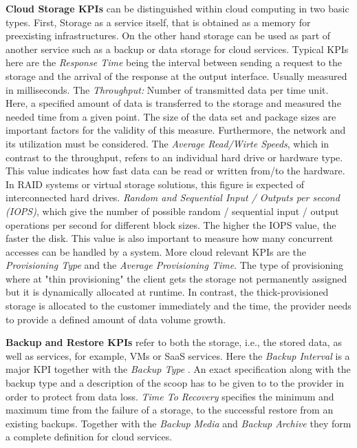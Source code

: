 \textbf{Cloud Storage KPIs} can be distinguished within cloud computing in two basic types. First, Storage as a service itself, that is obtained as a memory for preexisting infrastructures. On the other hand storage can be used as part of another service such as a backup or data storage for cloud services. Typical KPIs here are the \emph{Response Time} being the interval between sending a request to the storage and the arrival of the response at the output interface. Usually measured in milliseconds. The \emph{Throughput:} Number of transmitted data per time unit. Here, a specified amount of data is transferred to the storage and measured the needed time from a given point. The size of the data set and package sizes are important factors for the validity of this measure. Furthermore, the network and its utilization must be considered. The \emph{Average Read/Wirte Speeds}, which in contrast to the throughput,  refers to an individual hard drive or hardware type. This value indicates how fast data can be read or written from/to the hardware. In RAID systems or virtual storage solutions, this figure is expected of interconnected hard drives. \emph{Random and Sequential Input / Outputs per second (IOPS)}, which give the number of possible random / sequential  input / output operations per second for different block sizes. The higher the IOPS value, the faster the disk. This value is also important to measure how many concurrent accesses can be handled by a system. More cloud relevant KPIs are the \emph{Provisioning Type} and the \emph{Average Provisioning Time}. The type of provisioning where at "thin provisioning" the client gets the storage not permanently assigned but it is dynamically allocated at runtime. In contrast, the thick-provisioned storage is allocated to the customer immediately and the time, the provider needs to provide a defined amount of data volume growth. 
 
\textbf{Backup and Restore KPIs }refer to both the storage, i.e., the stored data, as well as services, for example, VMs or SaaS services. Here the \emph{Backup Interval} is a major KPI together with the \emph{Backup Type} . An exact specification along with the backup type and a description of the scoop has to be given to to the provider in order to protect from data loss. \emph{Time To Recovery} specifies the minimum and maximum time from the failure of a storage, to the successful restore from an existing backups. Together with the \emph{Backup Media} and \emph{Backup Archive}  they form a complete definition for cloud services.

